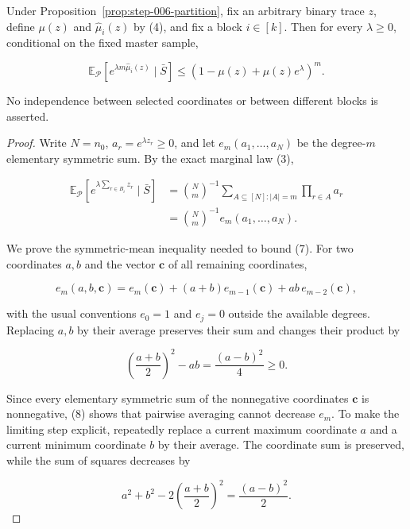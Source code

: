\begin{lemma}\label{lem:step-006-mgf}
Under Proposition~\ref{prop:step-006-partition}, fix an arbitrary binary
trace \(z\), define \(\mu(z)\) and \(\widehat\mu_i(z)\) by (4), and fix a
block \(i\in[k]\).  Then for every \(\lambda\geq0\), conditional on the
fixed master sample,

\[
 \mathbb E_{\mathcal P}
 \left[e^{\lambda m\widehat\mu_i(z)}\mid\bar S\right]
 \leq \left(1-\mu(z)+\mu(z)e^\lambda\right)^m.
\tag{6}
\]

No independence between selected coordinates or between different blocks
is asserted.


\end{lemma}

\begin{proof}
Write \(N=n_0\), \(a_r=e^{\lambda z_r}\geq0\), and let
\(e_m(a_1,\ldots,a_N)\) be the degree-\(m\) elementary symmetric sum.
By the exact marginal law (3),

\[
\begin{aligned}
 \mathbb E_{\mathcal P}
 \left[e^{\lambda\sum_{r\in B_i}z_r}\mid\bar S\right]
 &=\binom Nm^{-1}
   \sum_{A\subseteq[N]:|A|=m}\prod_{r\in A}a_r\\
 &=\binom Nm^{-1}e_m(a_1,\ldots,a_N).
\end{aligned}
\tag{7}
\]

We prove the symmetric-mean inequality needed to bound (7).  For two
coordinates \(a,b\) and the vector \(\mathbf c\) of all remaining
coordinates,

\[
 e_m(a,b,\mathbf c)
 =e_m(\mathbf c)+(a+b)e_{m-1}(\mathbf c)
  +ab\,e_{m-2}(\mathbf c),
\tag{8}
\]

with the usual conventions \(e_0=1\) and \(e_j=0\) outside the available
degrees.  Replacing \(a,b\) by their average preserves their sum and changes
their product by

\[
 \left(\frac{a+b}{2}\right)^2-ab=\frac{(a-b)^2}{4}\geq0.
\]

Since every elementary symmetric sum of the nonnegative coordinates
\(\mathbf c\) is nonnegative, (8) shows that pairwise averaging cannot
decrease \(e_m\).  To make the limiting step explicit, repeatedly replace a
current maximum coordinate \(a\) and a current minimum coordinate \(b\) by
their average.  The coordinate sum is preserved, while the sum of squares
decreases by

\[
 a^2+b^2-2\left(\frac{a+b}{2}\right)^2
 =\frac{(a-b)^2}{2}.
\]


\end{proof}
